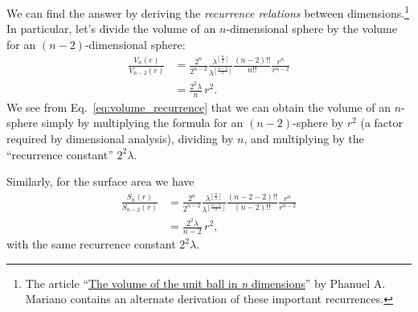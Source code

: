 {We can find the answer by deriving the \emph{recurrence relations} between dimensions.\footnote{The article ``\href{http://www2.math.uconn.edu/~mariano/research/MathClubsp14\%20.pdf}{The volume of the unit ball in \emph{n} dimensions}'' by Phanuel A. Mariano contains an alternate derivation of these important recurrences.} In particular, let's divide the volume of an $n$-dimensional sphere by the volume for an $(n-2)$-dimensional sphere:
\begin{equation}
\label{eq:volume_recurrence}
\begin{split}
\frac{V_n(r)}{V_{n-2}(r)} & =
\frac{2^n}{2^{n-2}}
\frac{\lambda^{\left\lfloor \frac{n}{2} \right\rfloor}}{\lambda^{\left\lfloor \frac{n-2}{2} \right\rfloor}}
\frac{(n-2)!!}{n!!}
\frac{r^{n}}{r^{n-2}}
\\ & = \frac{2^2\lambda}{n}\,r^2.
\end{split}
\end{equation}
We see from Eq.~\eqref{eq:volume_recurrence} that we can obtain the volume of an $n$-sphere simply by multiplying the formula for an $(n-2)$-sphere by $r^2$ (a factor required by dimensional analysis), dividing by $n$, and multiplying by the ``recurrence constant'' $2^2\lambda$.

Similarly, for the surface area we have
\begin{equation}
\label{eq:surface_area_recurrence}
\begin{split}
\frac{S_n(r)}{S_{n-2}(r)} & =
\frac{2^n}{2^{n-2}}
\frac{\lambda^{\left\lfloor \frac{n}{2} \right\rfloor}}{\lambda^{\left\lfloor \frac{n-2}{2} \right\rfloor}}
\frac{(n-2-2)!!}{(n-2)!!}
\frac{r^{n}}{r^{n-2}}
\\ & = \frac{2^2\lambda}{n-2}\,r^2,
\end{split}
\end{equation}
with the same recurrence constant $2^2\lambda$.

}
